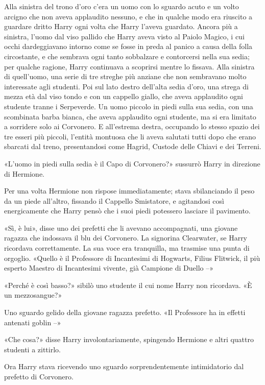 Alla sinistra del trono d’oro c’era un uomo con lo sguardo acuto e un volto arcigno che non aveva applaudito nessuno, e che in qualche modo era riuscito a guardare dritto Harry ogni volta che Harry l’aveva guardato. Ancora più a sinistra, l’uomo dal viso pallido che Harry aveva visto al Paiolo Magico, i cui occhi dardeggiavano intorno come se fosse in preda al panico a causa della folla circostante, e che sembrava ogni tanto sobbalzare e contorcersi nella sua sedia; per qualche ragione, Harry continuava a scoprirsi mentre lo fissava. Alla sinistra di quell’uomo, una serie di tre streghe più anziane che non sembravano molto interessate agli studenti. Poi sul lato destro dell’alta sedia d’oro, una strega di mezza età dal viso tondo e con un cappello giallo, che aveva applaudito ogni studente tranne i Serpeverde. Un uomo piccolo in piedi sulla sua sedia, con una scombinata barba bianca, che aveva applaudito ogni studente, ma si era limitato a sorridere solo ai Corvonero. E all’estrema destra, occupando lo stesso spazio dei tre esseri più piccoli, l’entità montuosa che li aveva salutati tutti dopo che erano sbarcati dal treno, presentandosi come Hagrid, Custode delle Chiavi e dei Terreni.

«L’uomo in piedi sulla sedia è il Capo di Corvonero?» sussurrò Harry in direzione di Hermione.

Per una volta Hermione non rispose immediatamente; stava sbilanciando il peso da un piede all’altro, fissando il Cappello Smistatore, e agitandosi così energicamente che Harry pensò che i suoi piedi potessero lasciare il pavimento.

«Sì, è lui», disse uno dei prefetti che li avevano accompagnati, una giovane ragazza che indossava il blu dei Corvonero. La signorina Clearwater, se Harry ricordava correttamente. La sua voce era tranquilla, ma trasmise una punta di orgoglio. «Quello è il Professore di Incantesimi di Hogwarts, Filius Flitwick, il più esperto Maestro di Incantesimi vivente, già Campione di Duello –»

«Perché è così basso?» sibilò uno studente il cui nome Harry non ricordava. «È un mezzosangue?»

Uno sguardo gelido della giovane ragazza prefetto. «Il Professore ha in effetti antenati goblin –»

«Che cosa?» disse Harry involontariamente, spingendo Hermione e altri quattro studenti a zittirlo.

Ora Harry stava ricevendo uno sguardo sorprendentemente intimidatorio dal prefetto di Corvonero.

